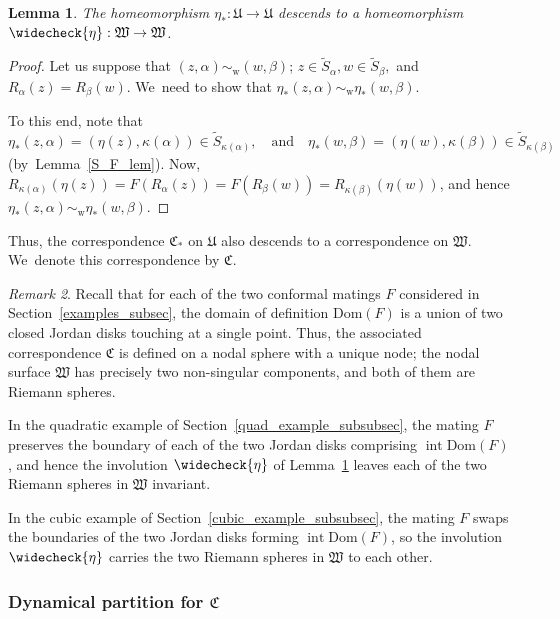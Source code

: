 \documentclass[JEP,XML,SOM,Unicode,NoFloatCountersInSection,published]{cedram}
\newtheorem{lemma}{Lemma}[section]
\theoremstyle{definition}
\theoremstyle{remark}
\newtheorem{remark}[lemma]{Remark}
\DeclareMathOperator{\Int}{int}
\begin{document}
\begin{lemma}\label{eta_descends_lem}
The homeomorphism $\eta_\ast:\mathfrak{U}\to\mathfrak{U}$ descends to a homeomorphism $\widecheck{\eta}:\mathfrak{W}\to\mathfrak{W}$.
\end{lemma}
\begin{proof}
Let us suppose that $(z,\alpha)\sim_{\mathrm{w}} (w,\beta)$; \ie $z\in\widetilde{S}_\alpha, w\in\widetilde{S}_\beta,$ and $R_\alpha(z)=R_\beta(w)$. We~need to show that $\eta_\ast(z,\alpha)\sim_{\mathrm{w}} \eta_\ast(w,\beta)$.

To this end, note that
\[
\eta_\ast(z,\alpha)=(\eta(z),\kappa(\alpha))\in\widetilde{S}_{\kappa(\alpha)},\quad \text{and}\quad \eta_\ast(w,\beta)=(\eta(w),\kappa(\beta))\in\widetilde{S}_{\kappa(\beta)}
\]
(by~Lemma~\ref{S_F_lem}). Now, $R_{\kappa(\alpha)}(\eta(z))=F(R_\alpha(z))=F(R_\beta(w))=R_{\kappa(\beta)}(\eta(w))$, and hence $\eta_\ast(z,\alpha)\sim_{\mathrm{w}} \eta_\ast(w,\beta)$.
\end{proof}

Thus, the correspondence $\mathfrak{C}_\ast$ on $\mathfrak{U}$ also descends to a correspondence on $\mathfrak{W}$. We~denote this correspondence by $\mathfrak{C}$.

\begin{remark}\label{examples_eta_rem}
Recall that for each of the two conformal matings $F$ considered in Section~\ref{examples_subsec}, the domain of definition $\mathrm{Dom}(F)$ is a union of two closed Jordan disks touching at a single point. Thus, the associated correspondence $\mathfrak{C}$ is defined on a nodal sphere with a unique node; \ie the nodal surface $\mathfrak{W}$ has precisely two non-singular components, and both of them are Riemann spheres.

In the quadratic example of Section~\ref{quad_example_subsubsec}, the mating $F$ preserves the boundary of each of the two Jordan disks comprising $\Int{\mathrm{Dom}(F)}$, and hence the involution $\widecheck{\eta}$ of Lemma~\ref{eta_descends_lem} leaves each of the two Riemann spheres in $\mathfrak{W}$ invariant.

In the cubic example of Section~\ref{cubic_example_subsubsec}, the mating $F$ swaps the boundaries of the two Jordan disks forming $\Int{\mathrm{Dom}(F)}$, so the involution $\widecheck{\eta}$ carries the two Riemann spheres in $\mathfrak{W}$ to each other.
\end{remark}

\subsubsection{Dynamical partition for $\mathfrak{C}$}\label{inv_partition_corr_2_subsubsec}
\end{document}
